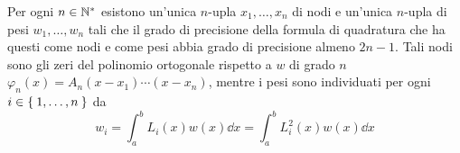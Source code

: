 	\begin{teorema}\label{th:formula-gaussiana-esiste-unica}
		Per ogni \(n \in \mathbb{N}^*\) esistono un'unica \(n\)-upla \(x_1, \dots, x_n\) di nodi e un'unica \(n\)-upla di pesi \(w_1, \dots, w_n\) tali che il grado di precisione della formula di quadratura che ha questi come nodi e come pesi abbia grado di precisione almeno \(2 n - 1\). Tali nodi sono gli zeri del polinomio ortogonale rispetto a \(w\) di grado \(n\) \(\varphi_n (x) = A_n (x - x_1) \cdots (x - x_n)\), mentre i pesi sono individuati per ogni \(i \in \Set{1, \dots, n}\) da
		\begin{equation}\label{eq:formule-gauss-pesi}
			w_i = \int_a^b L_i (x) w (x) \dd{x} = \int_a^b L_i^2 (x) w (x) \dd{x}
		\end{equation}
	\end{teorema}

